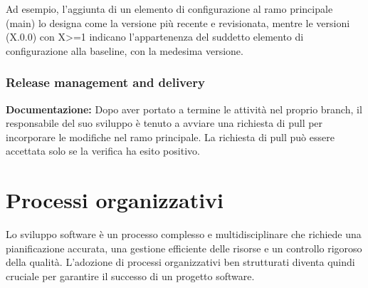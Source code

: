 \documentclass{article}
\begin{document}
Ad esempio, l'aggiunta di un elemento di configurazione al ramo principale (main) lo designa come la versione più recente e revisionata, mentre le versioni (X.0.0) con X>=1 indicano l'appartenenza del suddetto elemento di configurazione alla baseline, con la medesima versione.

\subsubsection{Release management and delivery}
\textbf{Documentazione:}
Dopo aver portato a termine le attività nel proprio branch, il responsabile del suo sviluppo è tenuto a avviare una richiesta di pull per incorporare le modifiche nel ramo principale. La richiesta di pull può essere accettata solo se la verifica ha esito positivo.

\section{Processi organizzativi}
Lo sviluppo software è un processo complesso e multidisciplinare che richiede una pianificazione accurata, una gestione efficiente delle risorse e un controllo rigoroso della qualità. L'adozione di processi organizzativi ben strutturati diventa quindi cruciale per garantire il successo di un progetto software.
\end{document}
